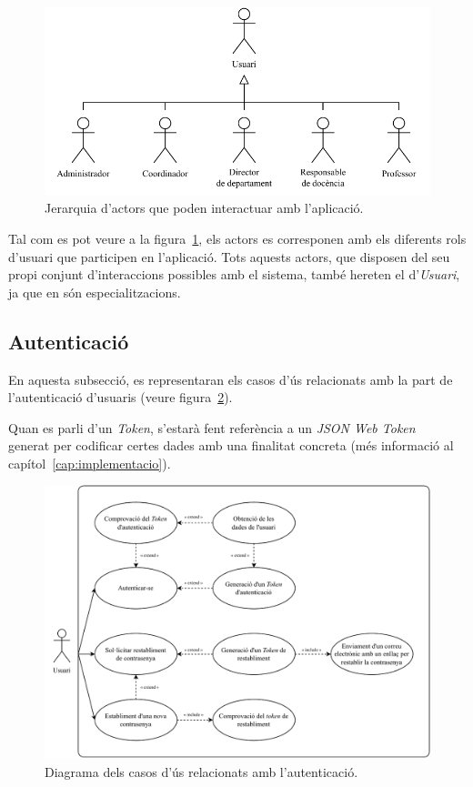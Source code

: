 \documentclass[a4paper,12pt]{ThesisStyle}
\begin{document}
\begin{figure}[H]
  \centering
  \includegraphics[width=\textwidth]{assets/use_cases/actors.pdf}
  \caption{\label{img:casos_us_actors}Jerarquia d'actors que poden interactuar amb l'aplicació.}
\end{figure}

Tal com es pot veure a la figura~\ref{img:casos_us_actors}, els actors es corresponen amb els diferents rols d'usuari que participen en l'aplicació. Tots aquests actors, que disposen del seu propi conjunt d'interaccions possibles amb el sistema, també hereten el d'\emph{Usuari}, ja que en són especialitzacions.

\subsection{Autenticació}
\label{subsec:casos_us_auth}

En aquesta subsecció, es representaran els casos d'ús relacionats amb la part de l'autenticació d'usuaris (veure figura~\ref{img:casos_us_auth}).

Quan es parli d'un \textit{Token}, s'estarà fent referència a un \textit{JSON Web Token}~\cite{JWT} generat per codificar certes dades amb una finalitat concreta (més informació al capítol~\ref{cap:implementacio}).

\begin{figure}[H]
  \centering
  \includegraphics[width=\textwidth]{assets/use_cases/auth.pdf}
  \caption{\label{img:casos_us_auth}Diagrama dels casos d'ús relacionats amb l'autenticació.}
\end{figure}
\end{document}
